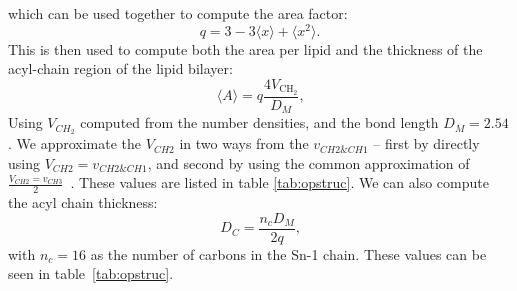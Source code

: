 \documentclass[12pt,openany,final]{book}
\newcommand{\db}{$\text{D}_\text{B}$}
\newcommand{\dhh}{$\text{D}_\text{hh}$}
\newcommand{\dc}{$\text{2D}_\text{C}$}
\newcommand{\TODO}{\hl{TODO}~}
\begin{document}
which can be used together to compute the area factor:
\begin{equation}
q = 3 - 3 \langle x \rangle + \langle x^2 \rangle\text{.}
\end{equation}
This is then used to compute both the area per lipid and the thickness of the acyl-chain region of the lipid bilayer:
\begin{equation}
    \langle A \rangle = q\frac{4V_{\text{CH}_2}}{D_M}\text{,}
\end{equation}
Using $V_{CH_2}$ computed from the number densities, and the bond length $D_M=2.54$.
We approximate the $V_{CH2}$ in two ways from the $v_{CH2\&CH1}$ -- first by directly using $V_{CH2}=v_{CH2\&CH1}$, and
second by using the common approximation of $\frac{V_{CH2}=v_{CH3}}{2}$~\cite{nagle:2000}.
These values are listed in table \ref{tab:opstruc}. We can also compute the acyl chain thickness:
\begin{equation}
    D_C = \frac{n_cD_M}{2q}\text{,}
\end{equation}
with $n_c=16$ as the number of carbons in the Sn-1 chain.
These values can be seen in table~\ref{tab:opstruc}.
\end{document}
